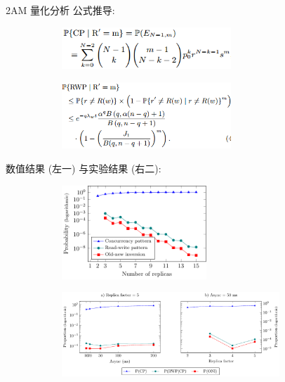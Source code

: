 \begin{frame}{2AM 量化分析}
  公式推导:
  \begin{figure}
	\begin{subfigure}{0.50\textwidth}
	  \centering
	  \includegraphics[width = 0.70\textwidth]{figures/cp.png}
	\end{subfigure}%
	\begin{subfigure}{0.50\textwidth}
	  \centering
	  \includegraphics[width = 0.70\textwidth]{figures/rwp.png}
	\end{subfigure}
  \end{figure}

  数值结果 (左一) 与实验结果 (右二): 
  \begin{figure}
	\begin{subfigure}{0.50\textwidth}
	  \centering
	  \includegraphics[width = 0.60\textwidth]{figures/oni-pgfplot.pdf}
	\end{subfigure}%
	\begin{subfigure}{0.50\textwidth}
	  \centering
	  \includegraphics[width = 0.90\textwidth]{figures/experiment-oni-pgfplot.pdf}
	\end{subfigure}
  \end{figure}
\end{frame}
